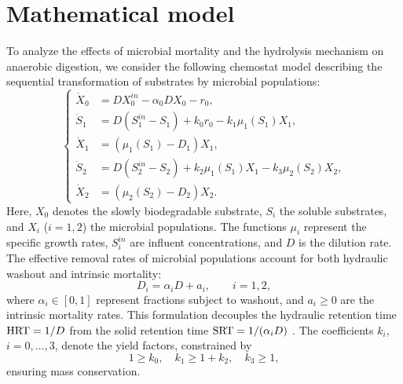 \documentclass[runningheads]{llncs}
\begin{document}
\section{Mathematical model}           \label{SecModel}
To analyze the effects of microbial mortality and the hydrolysis mechanism on anaerobic digestion, we consider the following chemostat model describing the sequential transformation of substrates by microbial populations:
\begin{equation}           \label{Am2HydModel}
\left\{
\begin{aligned}
\dot{X}_0 &= D X_0^{in} - \alpha_0 D X_0 - r_0, \\
\dot{S}_1 &= D(S_1^{in}-S_1) + k_0 r_0 - k_1 \mu_1(S_1) X_1, \\
\dot{X}_1 &= (\mu_1(S_1) - D_1) X_1, \\
\dot{S}_2 &= D(S_2^{in}-S_2) + k_2 \mu_1(S_1) X_1 - k_3 \mu_2(S_2) X_2, \\
\dot{X}_2 &= (\mu_2(S_2) - D_2) X_2.
\end{aligned}
\right.
\end{equation}
Here, $X_0$ denotes the slowly biodegradable substrate, $S_i$ the soluble substrates, and $X_i$ ($i=1,2$) the microbial populations. The functions $\mu_i$ represent the specific growth rates, $S_i^{in}$ are influent concentrations, and $D$ is the dilution rate.
The effective removal rates of microbial populations account for both hydraulic washout and intrinsic mortality:
\begin{equation}                                          \label{D1D2}
D_i = \alpha_i D + a_i, \qquad i=1,2,
\end{equation}
where $\alpha_i \in [0,1]$ represent fractions subject to washout, and $a_i \ge 0$ are the intrinsic mortality rates. This formulation decouples the hydraulic retention time ${\rm HRT}=1/D$ from the solid retention time ${\rm SRT}=1/(\alpha_i D)$ \cite{BenyahiaJPC2012,SariNonLinDyn2021}.
The coefficients $k_i$, $i=0,\ldots,3$, denote the yield factors, constrained by
\[
1 \ge k_0, \quad k_1 \ge 1+k_2, \quad k_3 \ge 1,
\]
ensuring mass conservation.
\end{document}
